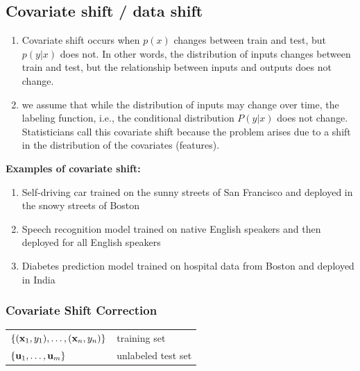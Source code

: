 \subsection{Covariate shift / data shift \cite{dnn-1,mit-imbalance-outliers-shift}} \label{Covariate shift / data shift}
\begin{enumerate}
    \item Covariate shift occurs when $p(x)$ changes between train and test, but $p(y|x)$ does not. In other words, the distribution of inputs changes between train and test, but the relationship between inputs and outputs does not change.

    \item we assume that while the distribution of inputs may change over time, the labeling function, i.e., the conditional distribution $P(y | x)$ does not change. Statisticians call this covariate shift because the problem arises due to a shift in the distribution of the covariates (features).

    
\end{enumerate}

\vspace{0.2cm}
\textbf{Examples of covariate shift:}
\begin{enumerate}
    \item Self-driving car trained on the sunny streets of San Francisco and deployed in the snowy streets of Boston
    \item Speech recognition model trained on native English speakers and then deployed for all English speakers
    \item Diabetes prediction model trained on hospital data from Boston and deployed in India
\end{enumerate}

\subsubsection{Covariate Shift Correction \cite{dnn-1}} \label{Covariate Shift Correction}

\begin{customTableWrapper}{1.2}
\begin{table}[H]
    \centering
    \begin{tabular}{l l}
        $\left\{(\mathbf{x}_1, y_1), \ldots, (\mathbf{x}_n, y_n)\right\}$ & training set \\

        $\left\{\mathbf{u}_1, \ldots, \mathbf{u}_m\right\}$ & unlabeled test set \\

    \end{tabular}
\end{table}
\end{customTableWrapper}

